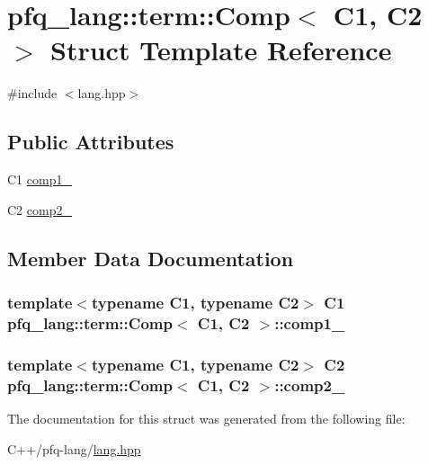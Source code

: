 \hypertarget{structpfq__lang_1_1term_1_1Comp}{\section{pfq\+\_\+lang\+:\+:term\+:\+:Comp$<$ C1, C2 $>$ Struct Template Reference}
\label{structpfq__lang_1_1term_1_1Comp}
}


{\ttfamily \#include $<$lang.\+hpp$>$}

\subsection*{Public Attributes}
\begin{DoxyCompactItemize}
\item 
C1 \hyperlink{structpfq__lang_1_1term_1_1Comp_a627462a10b6c14fce82c8b2425d808ca}{comp1\+\_\+}
\item 
C2 \hyperlink{structpfq__lang_1_1term_1_1Comp_abedc337ebe11815017c547655d3e23ad}{comp2\+\_\+}
\end{DoxyCompactItemize}


\subsection{Member Data Documentation}
\hypertarget{structpfq__lang_1_1term_1_1Comp_a627462a10b6c14fce82c8b2425d808ca}{
\subsubsection[{comp1\+\_\+}]{\setlength{\rightskip}{0pt plus 5cm}template$<$typename C1, typename C2$>$ C1 {\bf pfq\+\_\+lang\+::term\+::\+Comp}$<$ C1, C2 $>$\+::comp1\+\_\+}}\label{structpfq__lang_1_1term_1_1Comp_a627462a10b6c14fce82c8b2425d808ca}
\hypertarget{structpfq__lang_1_1term_1_1Comp_abedc337ebe11815017c547655d3e23ad}{
\subsubsection[{comp2\+\_\+}]{\setlength{\rightskip}{0pt plus 5cm}template$<$typename C1, typename C2$>$ C2 {\bf pfq\+\_\+lang\+::term\+::\+Comp}$<$ C1, C2 $>$\+::comp2\+\_\+}}\label{structpfq__lang_1_1term_1_1Comp_abedc337ebe11815017c547655d3e23ad}


The documentation for this struct was generated from the following file\+:\begin{DoxyCompactItemize}
\item 
C++/pfq-\/lang/\hyperlink{lang_8hpp}{lang.\+hpp}\end{DoxyCompactItemize}
